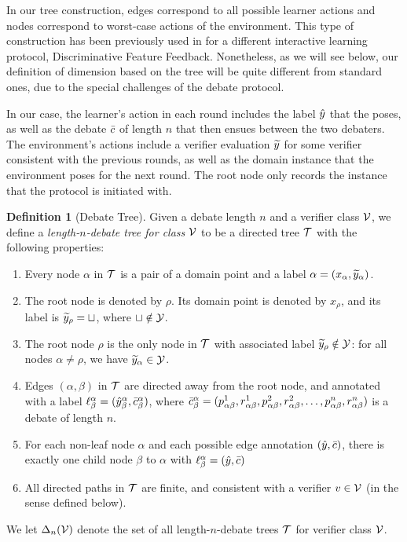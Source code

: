 \documentclass[11pt,letterpaper]{article}
\theoremstyle{definition}
\newtheorem{definition}[theorem]{Definition}
\theoremstyle{plain}
\begin{document}
In our tree construction, edges correspond to all possible learner actions 
and nodes correspond to worst-case actions of the environment. 
This type of construction has been previously used in \cite{oz2026discriminative} for a different interactive learning protocol, Discriminative Feature Feedback. Nonetheless, as we will see below, our definition of dimension based on the tree will be quite different from standard ones, due to the special challenges of the debate protocol.

In our case, the learner's action in each round includes the label $\hy$ that the \dt poses, as well as the debate $\sc$ of length $n$ that then ensues between the two debaters.
The environment's actions include a verifier evaluation $\vy$ for some verifier consistent with the previous rounds, as well as the  domain instance that the environment poses for the next round.
The root node only records the instance that the protocol is initiated with.



\begin{definition}[Debate Tree]
Given a debate length $n$ and a verifier class $\V$, we define a \emph{length-$n$-debate tree for class $\V$} to be a directed tree $\T$ with the following properties:
\begin{enumerate}
    \item Every node $\alpha$ in $\T$ is a pair of a domain point and a label $\alpha=(x_\alpha, \vy_\alpha)$.
    \item The root node is denoted by $\rho$. Its domain point is denoted by $x_\rho$, and its label is $\vy_\rho = \sqcup$, where $\sqcup\notin\Y$. \item The root node $\rho$ is the only node in $\T$ with associated label $\vy_\rho \notin\Y$: for all nodes $\alpha\neq \rho$, we have $\vy_\alpha\in \Y$.
    \item Edges $(\alpha, \beta)$ in $\T$ are directed away from the root node, and annotated with a label $\ell^\alpha_\beta = (\hy^\alpha_\beta, \sc^\alpha_\beta)$, where $\sc^\alpha_\beta = (\ct^1_{\alpha\beta}, \cf^1_{\alpha\beta}, \ct^2_{\alpha\beta}, \cf^2_{\alpha\beta}, \ldots,  \ct^n_{\alpha\beta}, \cf^n_{\alpha\beta})$ is a debate of length $n$.
    \item For each non-leaf node $\alpha$ and each possible edge annotation $(\hy, \sc)$, there is exactly one child node $\beta$ to $\alpha$ with $\ell^\alpha_\beta = (\hy, \sc)$
    \item All directed paths in $\T$ are finite, and consistent with a verifier $v\in\V$ (in the sense defined below).
\end{enumerate}
We let $\Delta_n(\V)$ denote the set of all length-$n$-debate trees $\T$ for verifier class $\V$.
\end{definition}
\end{document}
